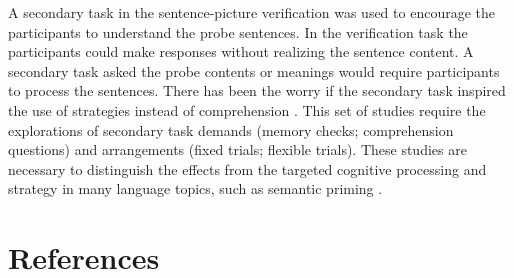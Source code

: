 \documentclass[
  man,floatsintext]{apa6}
\newlength{\cslhangindent}
\newlength{\cslentryspacingunit} %
\newenvironment{CSLReferences}[2] %
 {%
  \setlength{\parindent}{0pt}
  \ifodd #1
  \let\oldpar\par
  \def\par{\hangindent=\cslhangindent\oldpar}
  \fi
  \setlength{\parskip}{#2\cslentryspacingunit}
 }%
 {}
\begin{document}
A secondary task in the sentence-picture verification was used to encourage the participants to understand the probe sentences. In the verification task the participants could make responses without realizing the sentence content. A secondary task asked the probe contents or meanings would require participants to process the sentences. There has been the worry if the secondary task inspired the use of strategies instead of comprehension \autocite[e.g.,][]{rommersObjectShapeOrientation2013}. This set of studies require the explorations of secondary task demands (memory checks; comprehension questions) and arrangements (fixed trials; flexible trials). These studies are necessary to distinguish the effects from the targeted cognitive processing and strategy in many language topics, such as semantic priming \autocite{mcnamaraSemanticPrimingPerspectives2005}.

\newpage

\hypertarget{references}{%
\section{References}\label{references}}

\begingroup
\setlength{\parindent}{-0.5in}
\setlength{\leftskip}{0.5in}

\hypertarget{refs}{}
\begin{CSLReferences}{0}{0}
\end{CSLReferences}

\endgroup


\printbibliography
\end{document}
